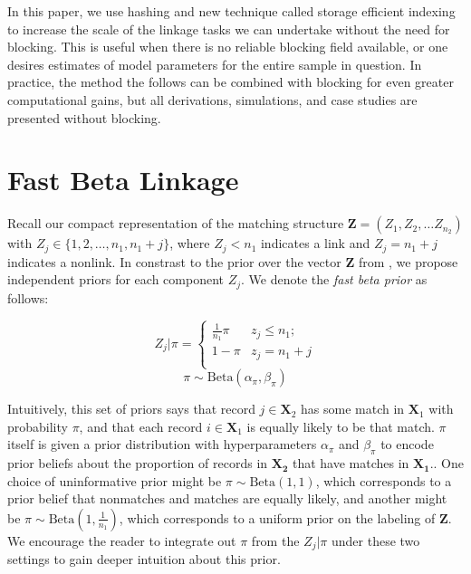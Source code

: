 \documentclass[12pt,letterpaper]{article}
\newcommand{\1}[1]{\mathbb{I}\!\left[#1\right]} %
\begin{document}
{In this paper, we use hashing and new technique called storage efficient indexing to increase the scale of the linkage tasks we can undertake without the need for blocking. This is useful when there is no reliable blocking field available, or one desires estimates of model parameters for the entire sample in question. In practice, the method the follows can be combined with blocking for even greater computational gains, but all derivations, simulations, and case studies are presented without blocking. 

%
%
%

\section{Fast Beta Linkage}
\label{sec:fast-beta-linkage}

Recall our compact representation of the matching structure $\bm{Z} = (Z_1, Z_2, \ldots Z_{n_2})$ with $Z_j \in \{1,2, \ldots, n_1, n_1 + j\}$, where $Z_j < n_1$ indicates a link and $Z_j = n_1 + j$ indicates a nonlink. In constrast to the prior over the vector $\bm{Z}$ from \cite{sadinle_bayesian_2017}, we propose independent priors for each component $Z_j$. We denote the \emph{fast beta prior} as follows:


$$Z_j | \pi =
\begin{cases} 
	\frac{1}{n_1}\pi  & z_j \leq n_1; \\
	1-\pi &  z_j  = n_1 + j \\
\end{cases}$$
$$\pi \sim \text{Beta}(\alpha_{\pi}, \beta_{\pi})$$


Intuitively, this set of priors says that record $j \in \bm{X}_2$ has some match in $\bm{X}_1$ with probability $\pi$, and that each record $i \in \bm{X}_1$ is equally likely to be that match. $\pi$ itself is given a prior distribution with hyperparameters $\alpha_{\pi}$ and $\beta_{\pi}$ to encode prior beliefs about  the proportion of records in $\bm{X_2}$ that have matches in $\bm{X_1}$.. One choice of uninformative prior might be \(\pi \sim \text{Beta}(1, 1)\), which corresponds to a prior belief that nonmatches and matches are equally likely, and another might be \(\pi \sim \text{Beta}\left(1, \frac{1}{n_1}\right)\), which corresponds to a uniform prior on the labeling of \(\mathbf{Z}\). We encourage the reader to integrate out $\pi$ from the $Z_j|\pi$ under these two settings to gain deeper intuition about this prior. 

}
\end{document}
